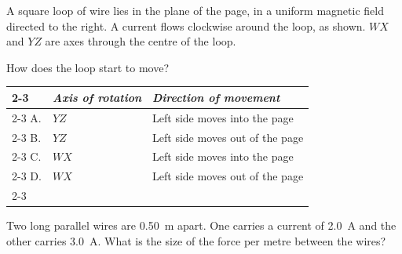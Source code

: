 \begin{quizq}{}
A square loop of wire lies in the plane of the page, in a uniform magnetic field directed to the right.
A current flows clockwise around the loop, as shown. $WX$ and $YZ$ are axes through the centre of the
loop.
\begin{center}
\end{center}
How does the loop start to move?
\begin{center}
  \renewcommand\arraystretch{1.7}
  \begin{tabular}{@{}p{10mm}|>{\centering\arraybackslash}p{38mm}|>{\centering\arraybackslash}p{56mm}|}
    \cline{2-3}
    & \textit{Axis of rotation} & \textit{Direction of movement}\\ \cline{2-3}
    A. & $YZ$ & Left side moves into the page\\ \cline{2-3}
    B. & $YZ$ & Left side moves out of the page\\ \cline{2-3}
    C. & $WX$ & Left side moves into the page\\ \cline{2-3}
    D. & $WX$ & Left side moves out of the page\\ \cline{2-3}
  \end{tabular}
\end{center}
\end{quizq}

\begin{quizq}{}
Two long parallel wires are \qty{0.50}{m} apart. One carries a current of \qty{2.0}{A} and the other
carries \qty{3.0}{A}. What is the size of the force per metre between the wires?
\end{quizq}

